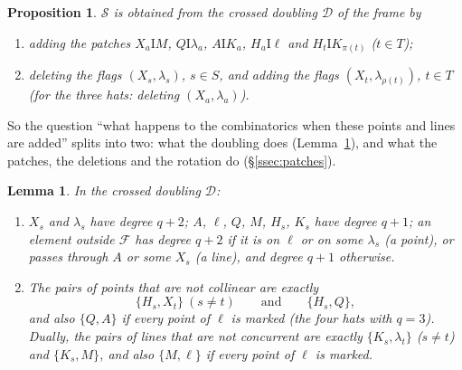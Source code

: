 \documentclass[11pt]{amsart}
\newtheorem{lemma}[theorem]{Lemma}
\newtheorem{proposition}[theorem]{Proposition}
\theoremstyle{definition}
\theoremstyle{remark}
\newcommand{\I}{\mathrel{\mathrm{I}}}
\newcommand{\cS}{\mathcal{S}}
\newcommand{\cD}{\mathcal{D}}
\newcommand{\cF}{\mathcal{F}}
\newcommand{\lam}{\lambda}
\begin{document}
\begin{proposition}\label{prop:doubling}
$\cS$ is obtained from the crossed doubling $\cD$ of the frame by
\begin{enumerate}[label=\textup{(\roman*)},leftmargin=2.5em]
\item adding the \emph{patches} $X_a\I M$, $Q\I\lam_a$, $A\I K_a$, $H_a\I\ell$ and $H_t\I K_{\pi(t)}$ \textup{(}$t\in T$\textup{)};
\item deleting the flags $(X_s,\lam_s)$, $s\in S$, and adding the flags $(X_t,\lam_{\rho(t)})$, $t\in T$ \textup{(}for the three hats: deleting $(X_a,\lam_a)$\textup{)}.
\end{enumerate}
\end{proposition}

So the question ``what happens to the combinatorics when these points and lines are added'' splits into two: what the doubling does (Lemma~\ref{lem:dbl}), and what the patches, the deletions and the rotation do (\S\ref{ssec:patches}).

\begin{lemma}\label{lem:dbl}
In the crossed doubling $\cD$:
\begin{enumerate}[label=\textup{(\alph*)}]
\item $X_s$ and $\lam_s$ have degree $q+2$; $A$, $\ell$, $Q$, $M$, $H_s$, $K_s$ have degree $q+1$; an element outside $\cF$ has degree $q+2$ if it is on $\ell$ or on some $\lam_s$ \textup{(}a point\textup{)}, or passes through $A$ or some $X_s$ \textup{(}a line\textup{)}, and degree $q+1$ otherwise.
\item The pairs of points that are not collinear are exactly
\[
\{H_s,X_t\}\ (s\ne t)\qquad\text{and}\qquad\{H_s,Q\},
\]
and also $\{Q,A\}$ if every point of $\ell$ is marked \textup{(}the four hats with $q=3$\textup{)}. Dually, the pairs of lines that are not concurrent are exactly $\{K_s,\lam_t\}$ \textup{(}$s\ne t$\textup{)} and $\{K_s,M\}$, and also $\{M,\ell\}$ if every point of $\ell$ is marked.
\end{enumerate}
\end{lemma}
\end{document}
